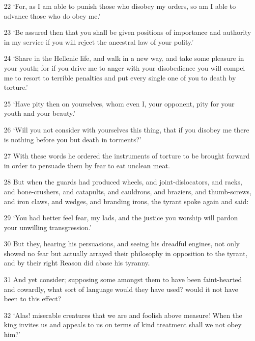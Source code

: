 \par 22 ‘For, as I am able to punish those who disobey my orders, so am I able to advance those who do obey me.’

\par 23 ‘Be assured then that you shall be given positions of importance and authority in my service if you will reject the ancestral law of your polity.’

\par 24 ‘Share in the Hellenic life, and walk in a new way, and take some pleasure in your youth; for if you drive me to anger with your disobedience you will compel me to resort to terrible penalties and put every single one of you to death by torture.’

\par 25 ‘Have pity then on yourselves, whom even I, your opponent, pity for your youth and your beauty.’

\par 26 ‘Will you not consider with yourselves this thing, that if you disobey me there is nothing before you but death in torments?’

\par 27 With these words he ordered the instruments of torture to be brought forward in order to persuade them by fear to eat unclean meat.

\par 28 But when the guards had produced wheels, and joint-dislocators, and racks, and bone-crushers, and catapults, and cauldrons, and braziers, and thumb-screws, and iron claws, and wedges, and branding irons, the tyrant spoke again and said:

\par 29 ‘You had better feel fear, my lads, and the justice you worship will pardon your unwilling transgression.’

\par 30 But they, hearing his persuasions, and seeing his dreadful engines, not only showed no fear but actually arrayed their philosophy in opposition to the tyrant, and by their right Reason did abase his tyranny.

\par 31 And yet consider; supposing some amongst them to have been faint-hearted and cowardly, what sort of language would they have used? would it not have been to this effect?

\par 32 ‘Alas! miserable creatures that we are and foolish above measure! When the king invites us and appeals to us on terms of kind treatment shall we not obey him?’

